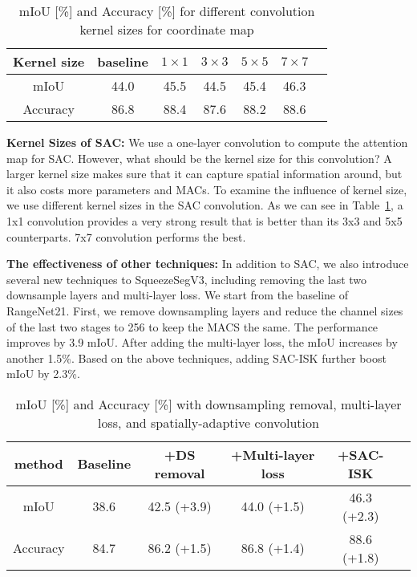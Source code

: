 \documentclass[runningheads]{llncs}
\begin{document}
\begin{table}[!t]
\footnotesize

\centering
\begin{tabular}{ c c c c c c c }
\hline
Kernel size & baseline & $1 \times 1$ & $3 \times 3$ & $5 \times 5$ & $7 \times 7$ \\
 \hline
 \hline
 mIoU&44.0&45.5 &44.5 &45.4 & 46.3\\
 Accuracy& 86.8& 88.4& 87.6&88.2 &88.6\\
\hline
\end{tabular}


\caption{mIoU [\%] and Accuracy [\%] for different convolution kernel sizes for coordinate map}
\label{tab:kernel}
\end{table}
\noindent\textbf{Kernel Sizes of SAC:}  We use a one-layer convolution to compute the attention map for SAC. However, what should be the kernel size for this convolution? A larger kernel size makes sure that it can capture spatial information around, but it also costs more parameters and MACs. To examine the influence of kernel size, we use different kernel sizes in the SAC convolution. As we can see in Table~\ref{tab:kernel}, a 1x1 convolution provides a very strong result that is better than its 3x3 and 5x5 counterparts. 7x7 convolution performs the best.  

\noindent\textbf{The effectiveness of other techniques:} In addition to SAC, we also introduce several new techniques to SqueezeSegV3, including removing the last two downsample layers and multi-layer loss. We start from the baseline of RangeNet21. 
First, we remove downsampling layers and reduce the channel sizes of the last two stages to 256 to keep the MACS the same. The performance improves by 3.9 mIoU. After adding the multi-layer loss, the mIoU increases by another 1.5\%. Based on the above techniques, adding SAC-ISK further boost mIoU by 2.3\%. 


\begin{table}[!t]

\footnotesize
\centering
\begin{tabular}{c c c c c c }
\hline
method& Baseline & +DS removal & +Multi-layer loss & +SAC-ISK & \\
 \hline
 \hline
 mIoU & 38.6&42.5 (+3.9) & 44.0 (+1.5)& 46.3 (+2.3)\\
 Accuracy & 84.7 & 86.2 (+1.5) &86.8 (+1.4) &88.6 (+1.8)\\
\hline
\end{tabular}

\caption{mIoU [\%] and Accuracy [\%] with downsampling removal, multi-layer loss, and spatially-adaptive convolution}
\label{tab:other}
\end{table}
\end{document}

